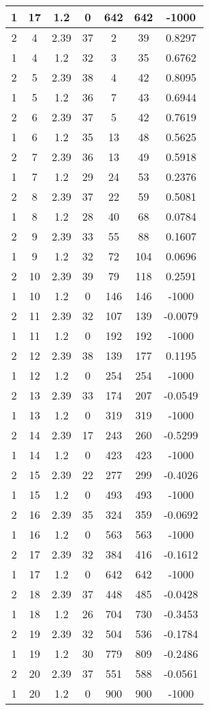 \documentclass[letterpaper, 12pt]{article}
\begin{document}
\begin{longtable}{|c|c|c|c|c|c|c|}
\hline
1 & 17 & 1.2 & 0 & 642 & 642 & -1000 \\
\hline
2 & 4 & 2.39 & 37 & 2 & 39 & 0.8297 \\
\hline
1 & 4 & 1.2 & 32 & 3 & 35 & 0.6762 \\
\hline
2 & 5 & 2.39 & 38 & 4 & 42 & 0.8095 \\
\hline
1 & 5 & 1.2 & 36 & 7 & 43 & 0.6944 \\
\hline
2 & 6 & 2.39 & 37 & 5 & 42 & 0.7619 \\
\hline
1 & 6 & 1.2 & 35 & 13 & 48 & 0.5625 \\
\hline
2 & 7 & 2.39 & 36 & 13 & 49 & 0.5918 \\
\hline
1 & 7 & 1.2 & 29 & 24 & 53 & 0.2376 \\
\hline
2 & 8 & 2.39 & 37 & 22 & 59 & 0.5081 \\
\hline
1 & 8 & 1.2 & 28 & 40 & 68 & 0.0784 \\
\hline
2 & 9 & 2.39 & 33 & 55 & 88 & 0.1607 \\
\hline
1 & 9 & 1.2 & 32 & 72 & 104 & 0.0696 \\
\hline
2 & 10 & 2.39 & 39 & 79 & 118 & 0.2591 \\
\hline
1 & 10 & 1.2 & 0 & 146 & 146 & -1000 \\
\hline
2 & 11 & 2.39 & 32 & 107 & 139 & -0.0079 \\
\hline
1 & 11 & 1.2 & 0 & 192 & 192 & -1000 \\
\hline
2 & 12 & 2.39 & 38 & 139 & 177 & 0.1195 \\
\hline
1 & 12 & 1.2 & 0 & 254 & 254 & -1000 \\
\hline
2 & 13 & 2.39 & 33 & 174 & 207 & -0.0549 \\
\hline
1 & 13 & 1.2 & 0 & 319 & 319 & -1000 \\
\hline
2 & 14 & 2.39 & 17 & 243 & 260 & -0.5299 \\
\hline
1 & 14 & 1.2 & 0 & 423 & 423 & -1000 \\
\hline
2 & 15 & 2.39 & 22 & 277 & 299 & -0.4026 \\
\hline
1 & 15 & 1.2 & 0 & 493 & 493 & -1000 \\
\hline
2 & 16 & 2.39 & 35 & 324 & 359 & -0.0692 \\
\hline
1 & 16 & 1.2 & 0 & 563 & 563 & -1000 \\
\hline
2 & 17 & 2.39 & 32 & 384 & 416 & -0.1612 \\
\hline
1 & 17 & 1.2 & 0 & 642 & 642 & -1000 \\
\hline
2 & 18 & 2.39 & 37 & 448 & 485 & -0.0428 \\
\hline
1 & 18 & 1.2 & 26 & 704 & 730 & -0.3453 \\
\hline
2 & 19 & 2.39 & 32 & 504 & 536 & -0.1784 \\
\hline
1 & 19 & 1.2 & 30 & 779 & 809 & -0.2486 \\
\hline
2 & 20 & 2.39 & 37 & 551 & 588 & -0.0561 \\
\hline
1 & 20 & 1.2 & 0 & 900 & 900 & -1000 \\
\hline
\end{longtable}
\end{document}
